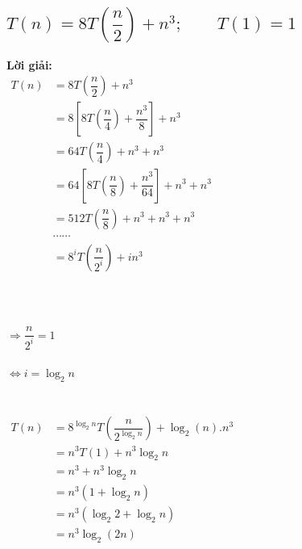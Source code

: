 \documentclass[12pt, letterpaper]{article}
\begin{document}
\subsection{$T(n) = 8T(\dfrac{n}{2}) + n^3; \quad \quad T(1) = 1$}
\textbf{Lời giải:} \\
$ \begin{aligned}
    T(n) &= 8T(\dfrac{n}{2}) + n^3 \\
        &= 8[8T(\dfrac{n}{4}) + \dfrac{n^3}{8}] + n^3 \\
        &= 64T(\dfrac{n}{4}) + n^3 + n^3 \\
        &= 64[8T(\dfrac{n}{8}) + \dfrac{n^3}{64}] + n^3 + n^3 \\
        &= 512T(\dfrac{n}{8}) + n^3 + n^3 + n^3 \\
        &\cdots \cdots \\
        &= 8^iT(\dfrac{n}{2^i}) + in^3 \\
\end{aligned} $ \\ \\ \\
 \\
$\Rightarrow \dfrac{n}{2^i} = 1$ \\ \\
$\Leftrightarrow i = \log_2{n}$ \\ \\
 \\
$ \begin{aligned}
    T(n) &= 8^{\log_2{n}}T(\dfrac{n}{2^{\log_2{n}}}) + \log_2(n).n^3 \\
        &= n^3T(1) + n^3\log_2{n} \\
        &= n^3 + n^3\log_2{n} \\
        &= n^3(1 + \log_2{n}) \\
        &= n^3(\log_2{2} + \log_2{n}) \\
        &= n^3\log_2(2n)
\end{aligned} $

\end{document}
